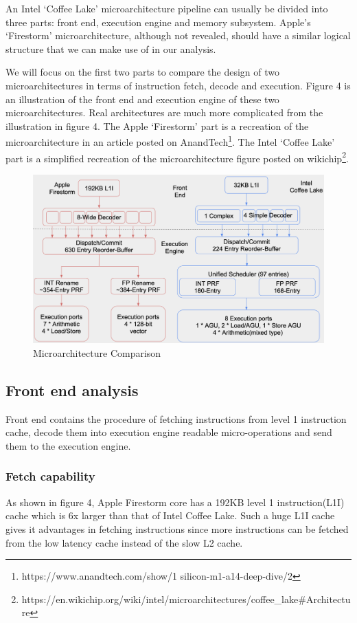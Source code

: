\documentclass[11pt]{article}
\begin{document}
An Intel ‘Coffee Lake’ microarchitecture pipeline can usually be divided into three parts: front end, execution engine and memory subsystem. Apple’s ‘Firestorm’ microarchitecture, although not revealed, should have a similar logical structure that we can make use of in our analysis.

We will focus on the first two parts to compare the design of two microarchitectures in terms of instruction fetch, decode and execution. Figure 4 is an illustration of the front end and execution engine of these two microarchitectures. Real architectures are much more complicated from the illustration in figure 4. The Apple ‘Firestorm’ part is a recreation of the microarchitecture in an article posted on AnandTech\footnote{https://www.anandtech.com/show/1
silicon-m1-a14-deep-dive/2}.
The Intel ‘Coffee Lake’ part is a simplified recreation of the microarchitecture figure posted on wikichip\footnote{https://en.wikichip.org/wiki/intel/microarchitectures/coffee\_lake\#Architecture}.
\begin{figure}[h]
    \centering
    \includegraphics[scale = 0.4]{microarchitecture.png}
    \caption{Microarchitecture Comparison}
	\label{fig:Microarchitecture Comparison}
\end{figure}
\subsection*{Front end analysis}
Front end contains the procedure of fetching instructions from level 1 instruction cache, decode them into execution engine readable micro-operations and send them to the execution engine. 
\subsubsection*{Fetch capability}
As shown in figure 4, Apple Firestorm core has a 192KB level 1 instruction(L1I) cache which is 6x larger than that of Intel Coffee Lake. Such a huge L1I cache gives it advantages in fetching instructions since more instructions can be fetched from the low latency cache instead of the slow L2 cache.
\end{document}
